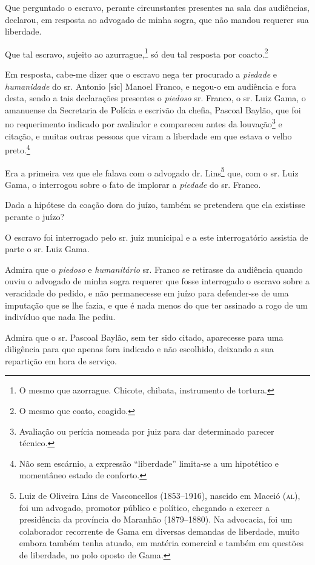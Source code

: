 Que perguntado o escravo, perante circunstantes presentes na sala das
audiências, declarou, em resposta ao advogado de minha sogra, que não
mandou requerer sua liberdade.

Que tal escravo, sujeito ao azurrague,\footnote{ O mesmo que azorrague.
  Chicote, chibata, instrumento de tortura.} só deu tal resposta por
coacto.\footnote{ O mesmo que coato, coagido.}

Em resposta, cabe-me dizer que o escravo nega ter procurado a
\emph{piedade} e \emph{humanidade} do sr. Antonio {[}sic{]} Manoel
Franco, e negou-o em audiência e fora desta, sendo a tais declarações
presentes o \emph{piedoso} sr. Franco, o sr. Luiz Gama, o amanuense da
Secretaria de Polícia e escrivão da chefia, Pascoal Baylão, que foi no
requerimento indicado por avaliador e compareceu antes da
louvação\footnote{ Avaliação ou perícia nomeada por juiz para dar
  determinado parecer técnico.} e citação, e muitas outras pessoas que
viram a liberdade em que estava o velho preto.\footnote{Não sem
  escárnio, a expressão ``liberdade'' limita-se a um hipotético e
  momentâneo estado de conforto.}

Era a primeira vez que ele falava com o advogado dr. Lins\footnote{
  Luiz de Oliveira Lins de Vasconcellos (1853--1916), nascido em Maceió
  (\textsc{al}), foi um advogado, promotor público e político, chegando a exercer
  a presidência da província do Maranhão (1879--1880). Na advocacia, foi
  um colaborador recorrente de Gama em diversas demandas de liberdade,
  muito embora também tenha atuado, em matéria comercial e também em
  questões de liberdade, no polo oposto de Gama.} que, com o sr. Luiz
Gama, o interrogou sobre o fato de implorar a \emph{piedade} do sr.
Franco.

Dada a hipótese da coação dora do juízo, também se pretendera que ela
existisse perante o juízo?

O escravo foi interrogado pelo sr. juiz municipal e a este
interrogatório assistia de parte o sr. Luiz Gama.

Admira que o \emph{piedoso} e \emph{humanitário} sr. Franco se retirasse
da audiência quando ouviu o advogado de minha sogra requerer que fosse
interrogado o escravo sobre a veracidade do pedido, e não permanecesse
em juízo para defender-se de uma imputação que se lhe fazia, e que é
nada menos do que ter assinado a rogo de um indivíduo que nada lhe
pediu.

Admira que o sr. Pascoal Baylão, sem ter sido citado, aparecesse para
uma diligência para que apenas fora indicado e não escolhido, deixando a
sua repartição em hora de serviço.

